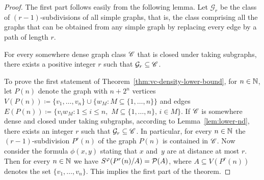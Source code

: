 
\begin{proof}
  The first part follows easily from the following lemma.  Let
  $\mathcal{G}_r$ be the class of $(r-1)$-subdivisions of all simple
  graphs, that is, the class comprising all the graphs that can be
  obtained from any simple graph by replacing every edge by a path of
  length $r$.

\begin{lemma}\label{lem:lower-nd}
  For every somewhere dense graph class $\mathscr{C}$ that is closed under
  taking subgraphs, there exists a positive integer $r$ such that
  $\mathcal{G}_{r}\subseteq \mathscr{C}$.
\end{lemma}

To prove the first statement of
Theorem~\ref{thm:vc-density-lower-bound}, for $n\in \mathbb{N}$, let $P(n)$
denote the graph with $n+2^n$ vertices
$V(P(n))\coloneqq \{v_1,\ldots, v_n\}\cup \{w_M \colon M\subseteq
\{1,\ldots, n\}\}$
and edges $E(P(n))\coloneqq \{v_iw_M \colon 1\leq i\leq n,$
$M\subseteq \{1,\ldots, n\},\, i\in M\}$.  If $\mathscr{C}$ is somewhere
dense and closed under taking subgraphs, according to
Lemma~\ref{lem:lower-nd}, there exists an integer $r$ such that
$\mathcal{G}_{r}\subseteq \mathscr{C}$. In particular, for every $n\in \mathbb{N}$
the $(r-1)$-subdivision $P^{r}(n)$ of the graph $P(n)$ is contained in
$\mathscr{C}$.  Now consider the formula $\phi(x,y)$ stating that $x$ and~$y$
are at distance at most $r$. Then for every $n\in \mathbb{N}$ we have
$S^\varphi(P^{r}(n)/A)=\mathcal{P}(A)$, where $A\subseteq V(P^{r}(n))$ denotes
the set $\{v_1,\ldots, v_n\}$. This implies the first part of the
theorem.


\end{proof}
